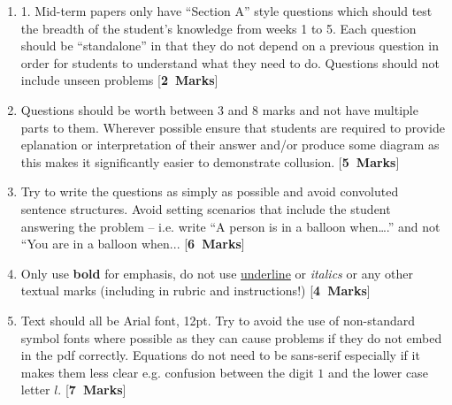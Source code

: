 \documentclass[12pt]{article}
\newcommand{\ptsmk}[1]{\phantom{.}\hfill[\textbf{#1~Marks}]}
\begin{document}
	\begin{enumerate}
		
\item 1.	Mid-term papers only have ``Section A'' style questions which should test the breadth of the student’s knowledge from weeks 1 to 5. Each question should be ``standalone'' in that they do not depend on a previous question in order for students to understand what they need to do. Questions should not include unseen problems 
\ptsmk{2}

\item Questions should be worth between 3 and 8 marks and not have multiple parts to them. Wherever possible ensure that students are required to provide eplanation or interpretation of their answer and/or produce some diagram as this makes it significantly easier to demonstrate collusion.
\ptsmk{5}

		\item Try to write the questions as simply as possible and avoid convoluted sentence structures. Avoid setting scenarios that include the student answering the problem – i.e. write “A person is in a balloon when….” and not “You are in a balloon when...
\ptsmk{6}


\item Only use \textbf{bold} for emphasis, do not use \underline{underline} or \textit{italics} or any other textual marks (including in rubric and instructions!)
\ptsmk{4}

\item Text should all be Arial font, 12pt. Try to avoid the use of non-standard symbol fonts where possible as they can cause problems if they do not embed in the pdf correctly. Equations do not need to be sans-serif especially if it makes them less clear e.g. confusion between the digit $1$ and the lower case letter $l$. %
\ptsmk{7}


	\end{enumerate}

	
	
	
	
\end{document}
